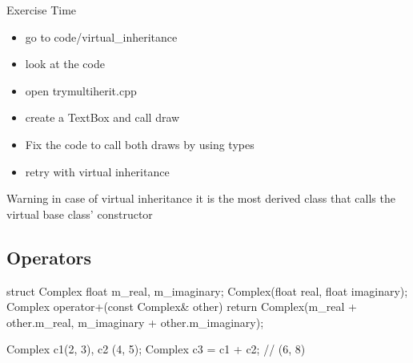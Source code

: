 \begin{frame}[fragile]
  \begin{alertblock}{Exercise Time}
    \begin{itemize}
    \item go to code/virtual\_inheritance
    \item look at the code
    \item open trymultiherit.cpp
    \item create a TextBox and call draw
    \item Fix the code to call both draws by using types
    \item retry with virtual inheritance
    \end{itemize}
  \end{alertblock}
\end{frame}

\begin{frame}[fragile]
  \begin{alertblock}{Warning}
    in case of virtual inheritance it is the most derived class that calls the virtual base class' constructor
  \end{alertblock}
\end{frame}


\subsection[Op]{Operators}

\begin{frame}[fragile]
  \begin{cppcode}
    struct Complex {
      float m_real, m_imaginary;
      Complex(float real, float imaginary);
      Complex operator+(const Complex& other) {
        return Complex(m_real + other.m_real,
                       m_imaginary + other.m_imaginary);
      }
    }

    Complex c1(2, 3), c2 (4, 5);
    Complex c3 = c1 + c2; // (6, 8)
  \end{cppcode}
\end{frame}

